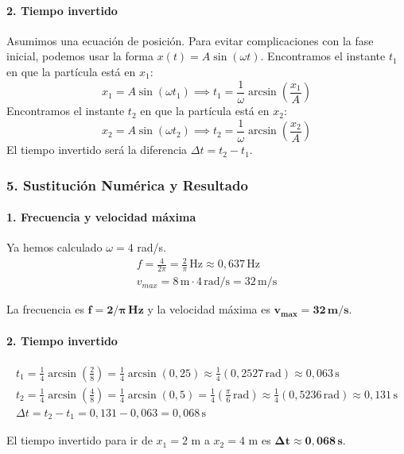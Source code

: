 \paragraph{2. Tiempo invertido}
Asumimos una ecuación de posición. Para evitar complicaciones con la fase inicial, podemos usar la forma $x(t)=A\sin(\omega t)$.
Encontramos el instante $t_1$ en que la partícula está en $x_1$:
$$ x_1 = A\sin(\omega t_1) \implies t_1 = \frac{1}{\omega}\arcsin\left(\frac{x_1}{A}\right) $$
Encontramos el instante $t_2$ en que la partícula está en $x_2$:
$$ x_2 = A\sin(\omega t_2) \implies t_2 = \frac{1}{\omega}\arcsin\left(\frac{x_2}{A}\right) $$
El tiempo invertido será la diferencia $\Delta t = t_2 - t_1$.

\subsubsection*{5. Sustitución Numérica y Resultado}
\paragraph{1. Frecuencia y velocidad máxima}
Ya hemos calculado $\omega=4$ rad/s.
\begin{gather}
    f = \frac{4}{2\pi} = \frac{2}{\pi} \, \text{Hz} \approx 0,637 \, \text{Hz} \\
    v_{max} = 8 \, \text{m} \cdot 4 \, \text{rad/s} = 32 \, \text{m/s}
\end{gather}
\begin{cajaresultado}
La frecuencia es $\boldsymbol{f = 2/\pi \, Hz}$ y la velocidad máxima es $\boldsymbol{v_{max} = 32 \, m/s}$.
\end{cajaresultado}

\paragraph{2. Tiempo invertido}
\begin{gather}
    t_1 = \frac{1}{4} \arcsin\left(\frac{2}{8}\right) = \frac{1}{4} \arcsin(0,25) \approx \frac{1}{4}(0,2527 \, \text{rad}) \approx 0,063 \, \text{s} \\
    t_2 = \frac{1}{4} \arcsin\left(\frac{4}{8}\right) = \frac{1}{4} \arcsin(0,5) = \frac{1}{4}\left(\frac{\pi}{6} \, \text{rad}\right) \approx \frac{1}{4}(0,5236 \, \text{rad}) \approx 0,131 \, \text{s} \\
    \Delta t = t_2 - t_1 = 0,131 - 0,063 = 0,068 \, \text{s}
\end{gather}
\begin{cajaresultado}
El tiempo invertido para ir de $x_1=2$ m a $x_2=4$ m es $\boldsymbol{\Delta t \approx 0,068 \, s}$.
\end{cajaresultado}

